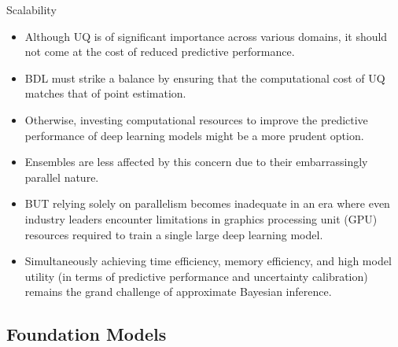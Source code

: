\documentclass[9pt,handout]{beamer}
\begin{document}
\begin{frame}{Scalability}
\begin{itemize}[<+->]
	\item Although UQ is of significant importance across various domains, it should not come at the cost of \alert{reduced predictive performance}. 
	\item BDL must \alert{strike a balance} by ensuring that the computational cost of UQ matches that of point estimation.
	\item Otherwise, investing computational resources to improve the predictive performance of deep learning models might be a more prudent option. 
	\item Ensembles are less affected by this concern due to their \alert{embarrassingly parallel} nature. 
	\item BUT relying solely on \alert{parallelism} becomes \alert{inadequate} in an era where even industry leaders encounter limitations in graphics processing unit (GPU) resources required to train a single large deep learning model. %
	\item Simultaneously achieving \alert{time efficiency, memory efficiency, and high model utility} (in terms of predictive performance and uncertainty calibration) remains the \alert{grand challenge} of approximate Bayesian inference. %
\end{itemize}
\end{frame}


\subsection{Foundation Models}
\end{document}
